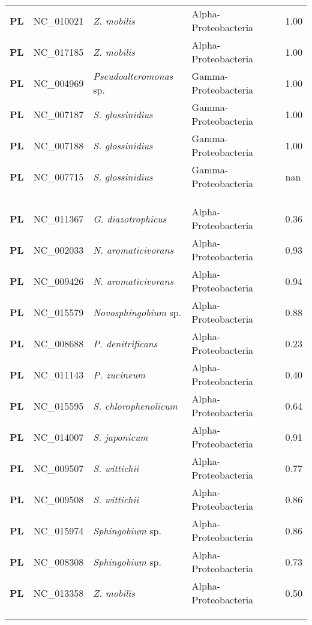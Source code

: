 \begin{adjustwidth}{-3cm}{2cm}
{\begin{supertabular}{>{\bfseries}l|p{0.1\textwidth}p{0.14\textwidth}l|l}
PL & NC\_010021 & \textit{Z. mobilis} & Alpha-Proteobacteria & 1.00\\
PL & NC\_017185 & \textit{Z. mobilis} & Alpha-Proteobacteria & 1.00\\
PL & NC\_004969 & \textit{Pseudoalteromonas} sp. & Gamma-Proteobacteria & 1.00\\
PL & NC\_007187 & \textit{S. glossinidius} & Gamma-Proteobacteria & 1.00\\
PL & NC\_007188 & \textit{S. glossinidius} & Gamma-Proteobacteria & 1.00\\
PL & NC\_007715 & \textit{S. glossinidius} & Gamma-Proteobacteria & nan\\
\\
\\
\hline\\
PL & NC\_011367 &  \textit{G. diazotrophicus} & Alpha-Proteobacteria & 0.36\\
PL & NC\_002033 &  \textit{N. aromaticivorans} & Alpha-Proteobacteria & 0.93\\
PL & NC\_009426 &  \textit{N. aromaticivorans} & Alpha-Proteobacteria & 0.94\\
PL & NC\_015579 &  \textit{Novosphingobium} sp. & Alpha-Proteobacteria & 0.88\\
PL & NC\_008688 &  \textit{P. denitrificans} & Alpha-Proteobacteria & 0.23\\
PL & NC\_011143 &  \textit{P. zucineum} & Alpha-Proteobacteria & 0.40\\
PL & NC\_015595 &  \textit{S. chlorophenolicum} & Alpha-Proteobacteria & 0.64\\
PL & NC\_014007 &  \textit{S. japonicum} & Alpha-Proteobacteria & 0.91\\
PL & NC\_009507 &  \textit{S. wittichii} & Alpha-Proteobacteria & 0.77\\
PL & NC\_009508 &  \textit{S. wittichii} & Alpha-Proteobacteria & 0.86\\
PL & NC\_015974 &  \textit{Sphingobium} sp. & Alpha-Proteobacteria & 0.86\\
PL & NC\_008308 &  \textit{Sphingobium} sp. & Alpha-Proteobacteria & 0.73\\
PL & NC\_013358 &  \textit{Z. mobilis} & Alpha-Proteobacteria & 0.50\\
\\
\\
\hline\\

\end{supertabular}}
\end{adjustwidth}
